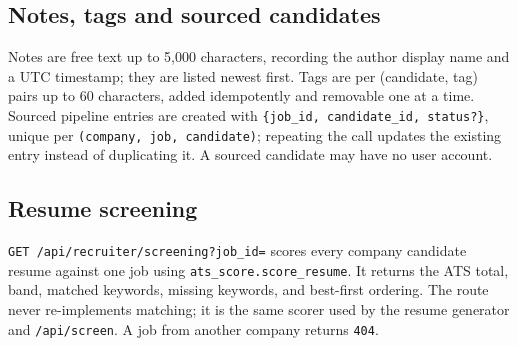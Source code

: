 \documentclass[11pt,a4paper]{article}
\newcommand{\code}[1]{\texttt{#1}}
\newcommand{\api}[2]{\texttt{\small #1\,#2}}
\begin{document}
\subsection{Notes, tags and sourced candidates}
Notes are free text up to 5{,}000 characters, recording the author display
name and a UTC timestamp; they are listed newest first. Tags are per
(candidate, tag) pairs up to 60 characters, added idempotently and removable
one at a time. Sourced pipeline entries are created with
\code{\{job\_id, candidate\_id, status?\}}, unique per
\code{(company, job, candidate)}; repeating the call updates the existing entry
instead of duplicating it. A sourced candidate may have no user account.

\subsection{Resume screening}
\api{GET}{/api/recruiter/screening?job\_id=} scores every company candidate
resume against one job using \code{ats\_score.score\_resume}. It returns the
ATS total, band, matched keywords, missing keywords, and best-first ordering.
The route never re-implements matching; it is the same scorer used by the
resume generator and \code{/api/screen}. A job from another company returns
\code{404}.
\end{document}
